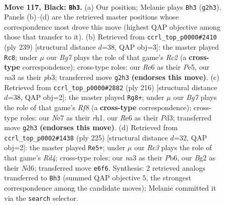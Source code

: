\documentclass[11pt]{article}
\begin{document}
\clearpage

\begin{figure}[p]\centering
\begin{subfigure}{0.46\textwidth}\centering
\resizebox{\linewidth}{!}{%
\newchessgame
\chessboard[
  setfen={7K/1k2n3/p3r3/P4p1p/5B2/N5P1/6b1/R7 b - - 45 117},
  showmover=false,
  pgfstyle=straightmove, color=movearrow, markmove={g2-h3}
]}
\caption{}
\end{subfigure}\hfill
\begin{subfigure}{0.46\textwidth}\centering
\resizebox{\linewidth}{!}{%
\newchessgame
\chessboard[
  setfen={8/2r3k1/3R2p1/p1p1p3/P1B1P3/1P2b1P1/6K1/8 b - - 0 120},
  showmover=false,
  pgfstyle=straightmove, color=movearrow, markmove={c7-c8}
]}
\caption{}
\end{subfigure}
\\[4pt]
\begin{subfigure}{0.46\textwidth}\centering
\resizebox{\linewidth}{!}{%
\newchessgame
\chessboard[
  setfen={5R2/8/4p3/3pP1k1/3P4/3P1K1p/5P2/7r w - - 6 109},
  showmover=false,
  pgfstyle=straightmove, color=movearrow, markmove={f8-g8}
]}
\caption{}
\end{subfigure}\hfill
\begin{subfigure}{0.46\textwidth}\centering
\resizebox{\linewidth}{!}{%
\newchessgame
\chessboard[
  setfen={4k3/R7/1p1n4/p2r4/P5BP/5P2/8/4K3 b - - 7 113},
  showmover=false,
  pgfstyle=straightmove, color=movearrow, markmove={d5-e5}
]}
\caption{}
\end{subfigure}
\caption{\textbf{Move 117, Black: \texttt{Bh3}.} (a) Our position; Melanie plays \texttt{Bh3} (\texttt{g2h3}). Panels (b)--(d) are the retrieved master positions whose correspondence most drove this move (highest QAP objective among those that transfer to it). (b) Retrieved from \texttt{ccrl\_top\_p0000\#2410} (ply 239) [structural distance $d$=38, QAP obj=3]: the master played \texttt{Rc8}; under $\mu$ our \emph{Bg7} plays the role of that game's \emph{Rc2} (a \textbf{cross-type} correspondence); cross-type roles: our \emph{R}e6 as their \emph{P}e5, our \emph{n}a3 as their \emph{p}b3; transferred move \texttt{g2h3} \textbf{(endorses this move)}. (c) Retrieved from \texttt{ccrl\_top\_p0000\#2882} (ply 216) [structural distance $d$=38, QAP obj=2]: the master played \texttt{Rg8+}; under $\mu$ our \emph{Bg7} plays the role of that game's \emph{Rf8} (a \textbf{cross-type} correspondence); cross-type roles: our \emph{N}e7 as their \emph{r}h1, our \emph{R}e6 as their \emph{P}d3; transferred move \texttt{g2h3} \textbf{(endorses this move)}. (d) Retrieved from \texttt{ccrl\_top\_p0002\#1438} (ply 225) [structural distance $d$=32, QAP obj=2]: the master played \texttt{Re5+}; under $\mu$ our \emph{Re3} plays the role of that game's \emph{Rd4}; cross-type roles: our \emph{n}a3 as their \emph{P}b6, our \emph{B}g2 as their \emph{N}d6; transferred move \texttt{e6f6}. Synthesis: 2 retrieved analogs transferred to \texttt{Bh3} (summed QAP objective 5, the strongest correspondence among the candidate moves); Melanie committed it via the \texttt{search} selector.}
\label{fig:thought-m233}
\end{figure}
\end{document}

